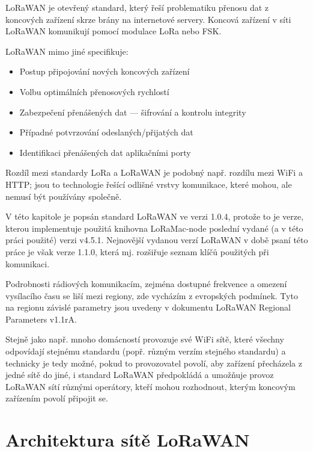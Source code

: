 
LoRaWAN je otevřený standard, který řeší problematiku přenosu dat z koncových
zařízení skrze brány na internetové servery. Koncová zařízení v síti LoRaWAN
komunikují pomocí modulace LoRa nebo FSK.

LoRaWAN mimo jiné specifikuje:

\begin{itemize}
    \item Postup připojování nových koncových zařízení
    \item Volbu optimálních přenosových rychlostí
    \item Zabezpečení přenášených dat --- šifrování a kontrolu integrity
    \item Případné potvrzování odeslaných/přijatých dat
    \item Identifikaci přenášených dat aplikačními porty
\end{itemize}

Rozdíl mezi standardy LoRa a LoRaWAN je podobný např. rozdílu mezi WiFi a HTTP; 
jsou to technologie řešící odlišné vrstvy komunikace, které mohou, ale nemusí
být používány společně.

V této kapitole je popsán standard LoRaWAN ve verzi 1.0.4, protože to je verze,
kterou implementuje použitá knihovna LoRaMac-node poslední vydané (a v této
práci použité) verzi v4.5.1.
Nejnovější vydanou verzí LoRaWAN v době psaní této práce je však verze 1.1.0,
která mj. rozšiřuje seznam klíčů použitých při komunikaci.



Podrobnosti rádiových komunikacím, zejména dostupné frekvence a omezení 
vysílacího času se liší mezi regiony, zde vycházím z evropských podmínek.
Tyto na regionu závislé parametry jsou uvedeny v dokumentu LoRaWAN Regional
Parameters v1.1rA.



Stejně jako např. mnoho domácností provozuje své WiFi sítě, které všechny 
odpovídají stejnému standardu (popř. různým verzím stejného standardu) a 
technicky je tedy možné, pokud to provozovatel povolí, aby zařízení přecházela
z jedné sítě do jiné, i standard LoRaWAN předpokládá a umožňuje
provoz LoRaWAN sítí různými operátory, kteří mohou rozhodnout, kterým koncovým
zařízením povolí připojit se.

\section{Architektura sítě LoRaWAN}

